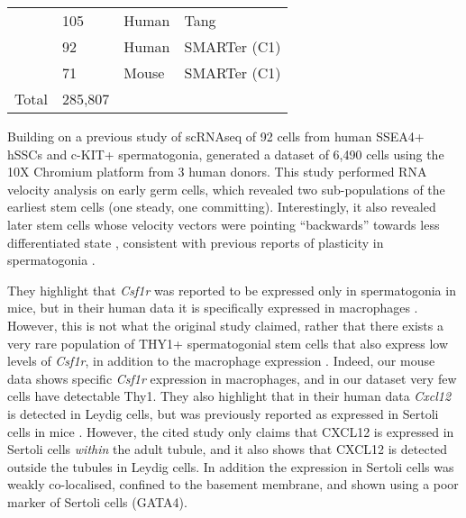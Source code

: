 \begin{table}[]
\begin{tabular}{@{}llll@{}}
		\cite{Neuhaus2017Singlecell}        & 105     & Human          & Tang                    \\
		\cite{Guo2017Chromatin}             & 92      & Human          & SMARTer (C1)      \\
		\cite{Liao2019Revealing}            & 71      & Mouse          & SMARTer (C1)           \\
		Total                                                & 285,807 &                &                             \\ \bottomrule
	\end{tabular}
\end{table}

Building on a previous study \parencite{Guo2017Chromatin} of scRNAseq of 92 cells from human SSEA4+ hSSCs and c-KIT+ spermatogonia, \cite{Guo2018adult} generated a dataset of 6,490 cells using the 10X Chromium platform from 3 human donors. This study performed RNA velocity analysis on early germ cells, which revealed two sub-populations of the earliest stem cells (one steady, one committing). Interestingly, it also revealed later stem cells whose velocity vectors were pointing ``backwards'' towards less differentiated state \parencite{Guo2018adult}, consistent with previous reports of plasticity in spermatogonia \parencite{Brawley2004Regeneration, Nakagawa2010Functional, Hara2014Mouse}.

They highlight that \textit{Csf1r} was reported to be expressed only in spermatogonia in mice, but in their human data it is specifically expressed in macrophages \parencite{Guo2018adult}. However, this is not what the original study claimed, rather that there exists a very rare population of THY1+ spermatogonial stem cells that also express low levels of \textit{Csf1r}, in addition to the macrophage expression \parencite{Oatley2009Colony}. Indeed, our mouse data shows specific \textit{Csf1r} expression in macrophages, and in our dataset very few cells have detectable Thy1. They also highlight that in their human data \textit{Cxcl12} is detected in Leydig cells, but was previously reported as expressed in Sertoli cells in mice \parencite{Yang2013CXCL12}. However, the cited study only claims that CXCL12 is expressed in Sertoli cells \emph{within} the adult tubule, and it also shows that CXCL12 is detected outside the tubules in Leydig cells. In addition the expression in Sertoli cells was weakly co-localised, confined to the basement membrane, and shown using a poor marker of Sertoli cells (GATA4).

